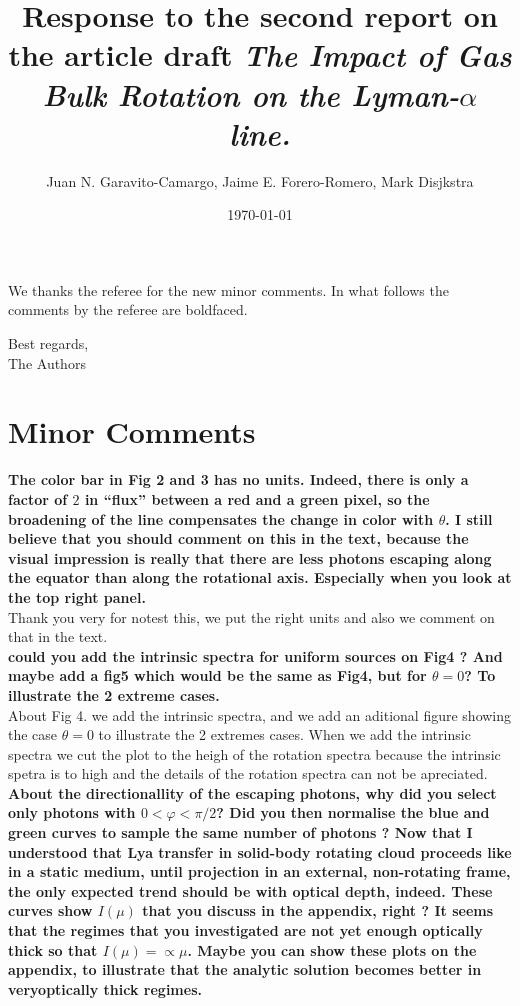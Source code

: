 \documentclass[12pt]{article}
\title{Response to the second report on the article draft \emph{The
    Impact of Gas Bulk Rotation on the Lyman-$\alpha$ line.}}
\author{Juan N. Garavito-Camargo, Jaime E. Forero-Romero, Mark Disjkstra}
\date{\today}
\begin{document}
\maketitle

We thanks the referee for the new minor comments. 
In what follows the comments by the referee are boldfaced.

Best regards, \\

The Authors\\

\section*{Minor Comments}

{\bf The color bar in Fig 2 and 3 has no units. Indeed, there is only a factor of $2$ in “flux” between a
red and a green pixel, so the broadening of the line compensates the change in color with $\theta$. I still
believe that you should comment on this in the text, because the visual impression is really that
there are less photons escaping along the equator than along the rotational axis. Especially when
you look at the top right panel.}\\

Thank you very for notest this, we put the right units and also we comment on that in the text.\\ 

{\bf could you add the intrinsic spectra for uniform sources on Fig4 ? And maybe add a fig5 which
would be the same as Fig4, but for $\theta = 0$? To illustrate the 2 extreme cases.}\\

About Fig 4. we add the intrinsic spectra, and we add an aditional figure showing the case $\theta=0$ to illustrate the 2 extremes
cases. When we add the intrinsic spectra we cut the plot to the heigh of the rotation spectra because the intrinsic spetra is to high 
and the details of the rotation spectra can not be apreciated.\\

{\bf About the directionallity of the escaping photons, why did you select only photons with $0 < \varphi < \pi/2$? Did you then normalise the blue and green curves to sample the same number of photons ? Now that I understood that Lya transfer in solid-body rotating cloud proceeds like in a static medium, until projection in an external, non-rotating frame, the only expected trend should be with optical depth, indeed. These curves show $I(\mu)$ that you discuss in the appendix, right ? It seems that the regimes that you investigated are not yet enough optically thick so that $I(\mu) = \propto \mu$. Maybe you can show these plots on the appendix, to illustrate that the analytic solution becomes better in veryoptically thick regimes.}\\
\end{document}
